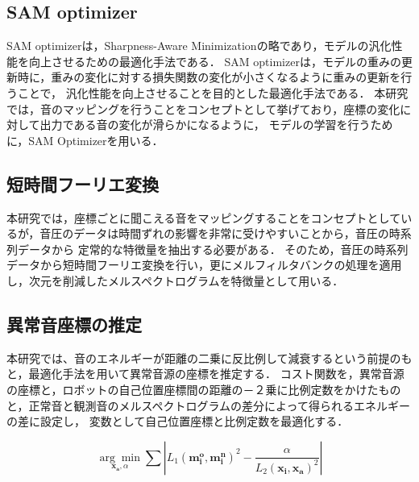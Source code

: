 \documentclass[../main]{subfiles}
\begin{document}
\subsection{SAM optimizer}
SAM optimizerは，Sharpness-Aware Minimizationの略であり，モデルの汎化性能を向上させるための最適化手法である．
SAM optimizerは，モデルの重みの更新時に，重みの変化に対する損失関数の変化が小さくなるように重みの更新を行うことで，
汎化性能を向上させることを目的とした最適化手法である．
本研究では，音のマッピングを行うことをコンセプトとして挙げており，座標の変化に対して出力である音の変化が滑らかになるように，
モデルの学習を行うために，SAM Optimizerを用いる．
\subsection{短時間フーリエ変換}
本研究では，座標ごとに聞こえる音をマッピングすることをコンセプトとしているが，音圧のデータは時間ずれの影響を非常に受けやすいことから，音圧の時系列データから
定常的な特徴量を抽出する必要がある．
そのため，音圧の時系列データから短時間フーリエ変換を行い，更にメルフィルタバンクの処理を適用し，次元を削減したメルスペクトログラムを特徴量として用いる．
\subsection{異常音座標の推定}
本研究では、音のエネルギーが距離の二乗に反比例して減衰するという前提のもと，最適化手法を用いて異常音源の座標を推定する．
コスト関数を，異常音源の座標と，ロボットの自己位置座標間の距離の－２乗に比例定数をかけたものと，正常音と観測音のメルスペクトログラムの差分によって得られるエネルギーの差に設定し，
変数として自己位置座標と比例定数を最適化する．

\begin{equation}
  \underset{\mathbf{x_a}, \alpha}{\arg\min} \sum \left| L_1 (\mathbf{m_i^o}, \mathbf{m_i^n})^2 - \frac{\alpha}{L_2 (\mathbf{x_i}, \mathbf{x_a})^2} \right|
\end{equation}
\end{document}
